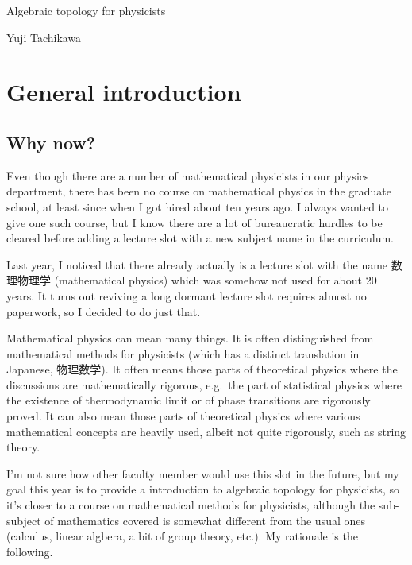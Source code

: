 \documentclass[12pt]{article}
\numberwithin{equation}{section}
\begin{document}
\centerline{\Large Algebraic topology for physicists}

\bigskip

\centerline{\large Yuji Tachikawa}

\setcounter{tocdepth}{2}
\tableofcontents

\newpage



\section{General introduction}

\subsection{Why now?}
\label{sec:whynow}

Even though there are a number of mathematical physicists in our physics department,
there has been no course on mathematical physics in the graduate school,
at least since when I got hired about ten years ago.
I always wanted to give one such course, but I know 
there are a lot of bureaucratic hurdles to be cleared before adding a lecture slot with a new subject name in the curriculum.

Last year, I noticed that there already actually is a lecture slot with the name
数理物理学 (mathematical physics)
which was somehow not used for about 20 years.
It turns out reviving a long dormant lecture slot requires almost no paperwork,
so I decided to do just that.

Mathematical physics can mean many things. 
It is often distinguished from mathematical methods for physicists (which has a distinct translation in Japanese, 物理数学).
It often means those parts of theoretical physics where the discussions are mathematically rigorous,
e.g.~the part of statistical physics where the existence of thermodynamic limit or of phase transitions are rigorously proved.
It can also mean those parts of theoretical physics where various mathematical concepts are heavily used, albeit not quite rigorously,
such as string theory.


I'm not sure how other faculty member would use this slot in the future,
but my goal this year is to provide a introduction to algebraic topology for physicists,
so it's closer to a course on mathematical methods for physicists,
although the sub-subject of mathematics covered is somewhat different from the usual ones (calculus, linear algbera, a bit of group theory, etc.).
My rationale is the following.
\end{document}

